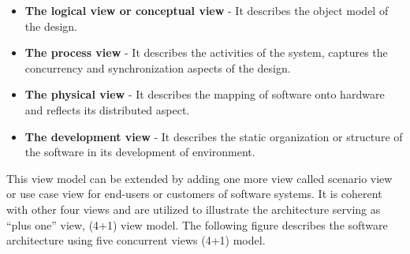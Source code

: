\documentclass[10pt,oneside]{report}
\begin{document}
\begin{itemize}
\item \textbf{The logical view or conceptual view} - It describes the object model of the design.
\item \textbf{The process view} - It describes the activities of the system, captures the concurrency and synchronization aspects of the design.
\item \textbf{The physical view} - It describes the mapping of software onto hardware and reflects its distributed aspect.
\item \textbf{The development view} - It describes the static organization or structure of the software in its development of environment.
\end{itemize}

This view model can be extended by adding one more view called scenario view or use case view for end-users or customers of software systems. It is coherent with other four views and are utilized to illustrate the architecture serving as “plus one” view, (4+1) view model. The following figure describes the software architecture using five concurrent views (4+1) model.



\end{document}

